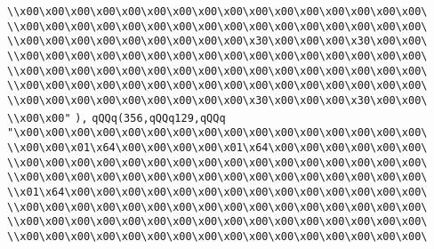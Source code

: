 \verb|\\x00\x00\x00\x00\x00\x00\x00\x00\x00\x00\x00\x00\x00\x00\x00\x00\|\newline
\verb|\\x00\x00\x00\x00\x00\x00\x00\x00\x00\x00\x00\x00\x00\x00\x00\x00\|\newline
\verb|\\x00\x00\x00\x00\x00\x00\x00\x00\x00\x30\x00\x00\x00\x30\x00\x00\|\newline
\verb|\\x00\x00\x00\x00\x00\x00\x00\x00\x00\x00\x00\x00\x00\x00\x00\x00\|\newline
\verb|\\x00\x00\x00\x00\x00\x00\x00\x00\x00\x00\x00\x00\x00\x00\x00\x00\|\newline
\verb|\\x00\x00\x00\x00\x00\x00\x00\x00\x00\x00\x00\x00\x00\x00\x00\x00\|\newline
\verb|\\x00\x00\x00\x00\x00\x00\x00\x00\x00\x30\x00\x00\x00\x30\x00\x00\|\newline
\verb|\\x00\x00"|\newline
\verb|),|\newline
\verb|qQQq(356,qQQq129,qQQq|\newline
\verb|"\x00\x00\x00\x00\x00\x00\x00\x00\x00\x00\x00\x00\x00\x00\x00\x00\|\newline
\verb|\\x00\x00\x01\x64\x00\x00\x00\x00\x01\x64\x00\x00\x00\x00\x00\x00\|\newline
\verb|\\x00\x00\x00\x00\x00\x00\x00\x00\x00\x00\x00\x00\x00\x00\x00\x00\|\newline
\verb|\\x00\x00\x00\x00\x00\x00\x00\x00\x00\x00\x00\x00\x00\x00\x00\x00\|\newline
\verb|\\x01\x64\x00\x00\x00\x00\x00\x00\x00\x00\x00\x00\x00\x00\x00\x00\|\newline
\verb|\\x00\x00\x00\x00\x00\x00\x00\x00\x00\x00\x00\x00\x00\x00\x00\x00\|\newline
\verb|\\x00\x00\x00\x00\x00\x00\x00\x00\x00\x00\x00\x00\x00\x00\x00\x00\|\newline
\verb|\\x00\x00\x00\x00\x00\x00\x00\x00\x00\x00\x00\x00\x00\x00\x00\x00\|\newline
